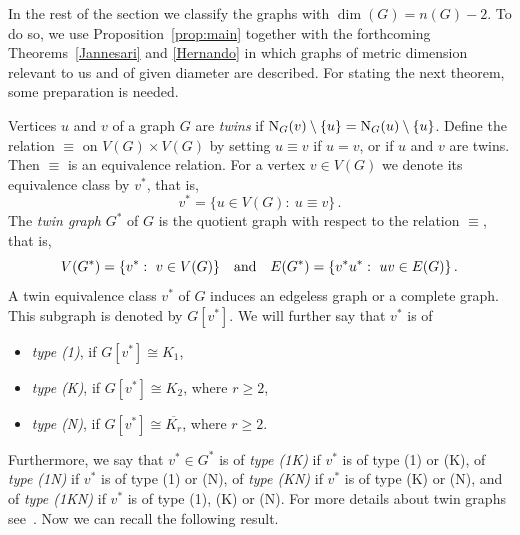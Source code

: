 \documentclass[12pt]{article}
\begin{document}
In the rest of the section we classify the graphs with $\dim(G) = n(G) - 2$. To do so, we use Proposition~\ref{prop:main} together with the forthcoming Theorems~\ref{Jannesari} and \ref{Hernando} in which graphs of metric dimension relevant to us and of given diameter are described. For stating the next theorem, some preparation is needed. 

Vertices $u$ and $v$ of a graph $G$ are {\it twins} if ${\rm N}_G(v) \setminus \{u\}={\rm N}_G(u) \setminus \{u\}$. Define the relation $\equiv$ on $V(G)\times V(G)$ by setting $u \equiv v$ if $u = v$, or if $u$ and $v$ are twins. Then $\equiv$ is an equivalence relation. For a vertex $v\in V(G)$ we denote its equivalence class by $v^{\ast}$, that is, 
$$v^{\ast} = \{u \in V(G):\ u \equiv v\}\,.$$ 
The {\em twin graph} $G^{\ast}$ of $G$ is the quotient graph with respect to the relation  $\equiv$, that is, 
$$V(G^{\ast}) = \{v^{\ast}:\ v \in V(G)\}\quad {\rm and}\quad E(G^{\ast}) = \{v^{\ast} u^{\ast}:\ uv \in E(G)\}\,.$$  
A twin equivalence class $v^{\ast}$ of $G$ induces an edgeless graph or a complete graph. This subgraph is denoted by $G[v^{\ast}]$. We will further say that $v^{\ast}$ is of 
\begin{itemize}
\item {\em type (1)}, if $G[v^{\ast}] \cong K_1$, 
\item {\em type (K)}, if $G[v^{\ast}] \cong K_2$, where $r\ge 2$, 
\item {\em type (N)}, if $G[v^{\ast}] \cong \overline{K_r}$, where $r\geq 2$.
\end{itemize}
Furthermore, we say that $v^{\ast} \in G^{\ast}$ is of {\em type (1K)} if $v^{\ast}$
is of type (1) or (K), of {\em type (1N)} if $v^{\ast}$ is of type (1) or (N), of {\em type (KN)} if $v^{\ast}$ is of type (K) or (N), and of {\em type (1KN)} if 
$v^{\ast}$ is of type (1), (K) or (N). For more details about twin graphs see~\cite{Hernando, Jannesari}. Now we can recall the following result. 
\end{document}
